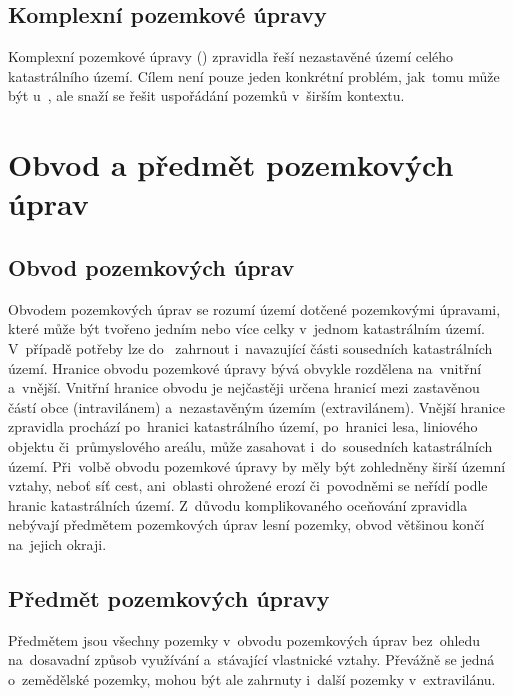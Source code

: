 \subsection{Komplexní pozemkové úpravy}
\label{komplexní_pu}

Komplexní pozemkové úpravy () zpravidla řeší nezastavěné
území celého kata\-strálního území. Cílem  není pouze jeden
konkrétní problém, jak~tomu může být u~, ale snaží se
řešit uspořádání pozemků v~širším kontextu.

\section{Obvod a předmět pozemkových úprav}
\label{obvod_a_predmet_pu}

\subsection{Obvod pozemkových úprav}
\label{obvod_pu}

Obvodem pozemkových úprav se rozumí území dotčené pozemkovými
úpra\-vami, které může být tvořeno jedním nebo více celky v~jednom
katastrálním území. V~pří\-padě potřeby lze do~ zahrnout
i~navazující části sousedních katastrálních území. Hranice obvodu
pozemkové úpravy bývá obvykle rozdělena na~vnitřní a~vnější. Vnitřní
hranice obvodu je nejčastěji určena hranicí mezi zastavěnou částí obce
(intravilánem) a~nezastavěným územím (extravilánem). Vnější hranice
zpravidla pro\-chází po~hranici katastrálního území, po~hranici lesa,
liniového objektu či~průmy\-slového areálu, může zasahovat
i~do~sousedních katastrálních území. Při~volbě obvodu pozemkové úpravy
by měly být zohledněny širší územní vztahy, neboť síť cest,
ani~oblasti ohrožené erozí či~povodněmi se neřídí podle hranic
katastrálních území. Z~důvodu komplikovaného oceňování 
zpravidla nebývají předmětem pozemkových úprav lesní pozemky, obvod většinou končí
na~jejich okraji.

\subsection{Předmět pozemkových úpravy}
\label{predmet_pu}

Předmětem  jsou všechny pozemky v~obvodu pozemkových úprav
bez~ohledu na~dosavadní způsob využívání a~stávající vlastnické
vztahy. Převážně se jedná o~zemědělské pozemky, mohou být ale zahrnuty
i~další pozemky v~extravilánu.

